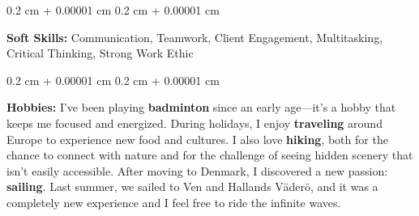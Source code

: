 \documentclass[10pt, letterpaper]{article}
\newenvironment{onecolentry}{
    \begin{adjustwidth}{
        0.2 cm + 0.00001 cm
    }{
        0.2 cm + 0.00001 cm
    }
}{
    \end{adjustwidth}
} %
\begin{document}
        \vspace{0.2 cm}

        \begin{onecolentry}
            \textbf{Soft Skills:} Communication, Teamwork, Client Engagement, Multitasking, Critical Thinking, Strong Work Ethic
        \end{onecolentry}

        \vspace{0.2 cm}

        \begin{onecolentry}
            \textbf{Hobbies:} 
            I’ve been playing \textbf{badminton} since an early age—it’s a hobby that keeps me focused and energized. During holidays, I enjoy \textbf{traveling} around Europe to experience new food and cultures. I also love \textbf{hiking}, both for the chance to connect with nature and for the challenge of seeing hidden scenery that isn’t easily accessible. After moving to Denmark, I discovered a new passion: \textbf{sailing}. Last summer, we sailed to Ven and Hallands Väderö, and it was a completely new experience and  I feel free to ride the infinite waves.
        \end{onecolentry}


    
\end{document}
